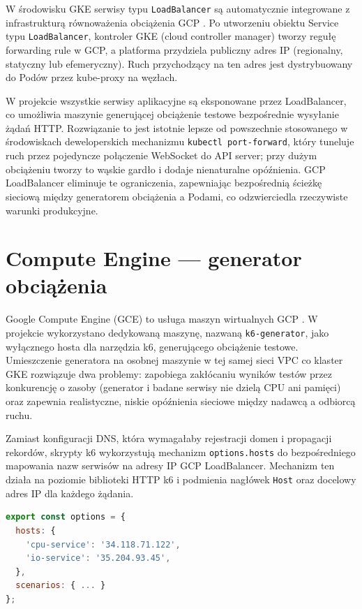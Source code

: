 W środowisku GKE serwisy typu \texttt{LoadBalancer} są automatycznie integrowane z infrastrukturą równoważenia obciążenia GCP \cite{gcp-lb-docs}. Po utworzeniu obiektu Service typu \texttt{LoadBalancer}, kontroler GKE (cloud controller manager) tworzy regułę forwarding rule w GCP, a platforma przydziela publiczny adres IP (regionalny, statyczny lub efemeryczny). Ruch przychodzący na ten adres jest dystrybuowany do Podów przez kube-proxy na węzłach.

W projekcie wszystkie serwisy aplikacyjne są eksponowane przez LoadBalancer, co umożliwia maszynie generującej obciążenie testowe bezpośrednie wysyłanie żądań HTTP. Rozwiązanie to jest istotnie lepsze od powszechnie stosowanego w środowiskach deweloperskich mechanizmu \texttt{kubectl port-forward}, który tuneluje ruch przez pojedyncze połączenie WebSocket do API server; przy dużym obciążeniu tworzy to wąskie gardło i dodaje nienaturalne opóźnienia. GCP LoadBalancer eliminuje te ograniczenia, zapewniając bezpośrednią ścieżkę sieciową między generatorem obciążenia a Podami, co odzwierciedla rzeczywiste warunki produkcyjne.

\section{Compute Engine — generator obciążenia}

Google Compute Engine (GCE) to usługa maszyn wirtualnych GCP \cite{gce-docs}. W projekcie wykorzystano dedykowaną maszynę, nazwaną \texttt{k6-generator}, jako wyłącznego hosta dla narzędzia k6, generującego obciążenie testowe. Umieszczenie generatora na osobnej maszynie w tej samej sieci VPC co klaster GKE rozwiązuje dwa problemy: zapobiega zakłócaniu wyników testów przez konkurencję o zasoby (generator i badane serwisy nie dzielą CPU ani pamięci) oraz zapewnia realistyczne, niskie opóźnienia sieciowe między nadawcą a odbiorcą ruchu.

Zamiast konfiguracji DNS, która wymagałaby rejestracji domen i propagacji rekordów, skrypty k6 wykorzystują mechanizm \texttt{options.hosts} do bezpośredniego mapowania nazw serwisów na adresy IP GCP LoadBalancer. Mechanizm ten działa na poziomie biblioteki HTTP k6 i podmienia nagłówek \texttt{Host} oraz docelowy adres IP dla każdego żądania.

\begin{lstlisting}[language=javascript, caption={Mapowanie hostów w opcjach skryptu k6}, label={lst:k6-hosts-mapping}]
export const options = {
  hosts: {
    'cpu-service': '34.118.71.122',
    'io-service': '35.204.93.45',
  },
  scenarios: { ... }
};
\end{lstlisting}

